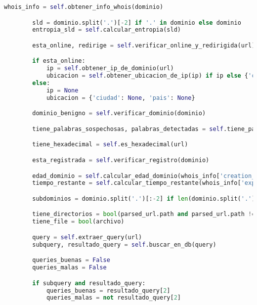 \documentclass{article}
\begin{document}
\begin{lstlisting}[language=Python, caption=Clase para extraer características de URLs]
        whois_info = self.obtener_info_whois(dominio)

        sld = dominio.split('.')[-2] if '.' in dominio else dominio
        entropia_sld = self.calcular_entropia(sld)

        esta_online, redirige = self.verificar_online_y_redirigida(url)

        if esta_online:
            ip = self.obtener_ip_de_dominio(url)
            ubicacion = self.obtener_ubicacion_de_ip(ip) if ip else {'ciudad': None, 'pais': None}
        else:
            ip = None
            ubicacion = {'ciudad': None, 'pais': None}

        dominio_benigno = self.verificar_dominio(dominio)

        tiene_palabras_sospechosas, palabras_detectadas = self.tiene_palabras_sospechosas(url, dominio)

        tiene_hexadecimal = self.es_hexadecimal(url)

        esta_registrada = self.verificar_registro(dominio)

        edad_dominio = self.calcular_edad_dominio(whois_info['creation_date'], whois_info['expiration_date'])
        tiempo_restante = self.calcular_tiempo_restante(whois_info['expiration_date'])

        subdominios = dominio.split('.')[:-2] if len(dominio.split('.')) > 2 else []

        tiene_directorios = bool(parsed_url.path and parsed_url.path != '/')
        tiene_file = bool(archivo)

        query = self.extraer_query(url)
        subquery, resultado_query = self.buscar_en_db(query)

        queries_buenas = False
        queries_malas = False

        if subquery and resultado_query:
            queries_buenas = resultado_query[2]
            queries_malas = not resultado_query[2]


\end{lstlisting}
\end{document}
